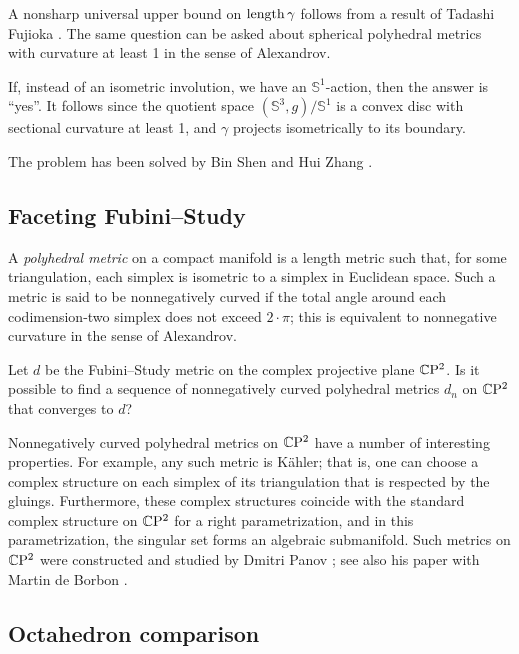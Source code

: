 A nonsharp universal upper bound on $\operatorname{\rm length}\gamma$ follows from a
result of Tadashi Fujioka \cite{fujioka2025}.
The same question can be asked about spherical polyhedral metrics with curvature at least 1 in the sense of Alexandrov.

If, instead of an isometric involution, we have an $\mathbb{S}^1$-action, then the answer is ``yes''.
It follows since the quotient space $(\mathbb{S}^3,g)/\mathbb{S}^1$ is a convex disc with sectional curvature at least 1,
and $\gamma$ projects isometrically to its boundary.

The problem has been solved by Bin Shen and Hui Zhang \cite{shen-zhan}.

\subsection{Faceting Fubini--Study}

A \emph{polyhedral metric} on a compact manifold is a length metric such that, for some triangulation, each simplex is isometric to a simplex in Euclidean space.
Such a metric is said to be nonnegatively curved if the total angle around each codimension-two simplex does not exceed $2\cdot\pi$; this is equivalent to nonnegative curvature in the sense of Alexandrov.

\begin{pr}
Let $d$ be the Fubini--Study metric on the complex projective plane $\mathbb{C}\mathrm{P}^2$.
Is it possible to find a sequence of nonnegatively curved polyhedral metrics $d_n$ on $\mathbb{C}\mathrm{P}^2$ that converges to $d$?
\end{pr}

Nonnegatively curved polyhedral metrics on $\mathbb{C}\mathrm{P}^2$ have a number of interesting properties.
For example, any such metric is Kähler; that is, one can choose a complex structure on each simplex of its triangulation that is respected by the gluings.
Furthermore, these complex structures coincide with the standard complex structure on $\mathbb{C}\mathrm{P}^2$ for a right parametrization, and in this parametrization, the singular set forms an algebraic submanifold.
Such metrics on $\mathbb{C}\mathrm{P}^2$ were constructed and studied by Dmitri Panov \cite{panov-Kaeler};
see also his paper with Martin de Borbon \cite{deborbon-panov2026}.

\subsection{Octahedron comparison}

